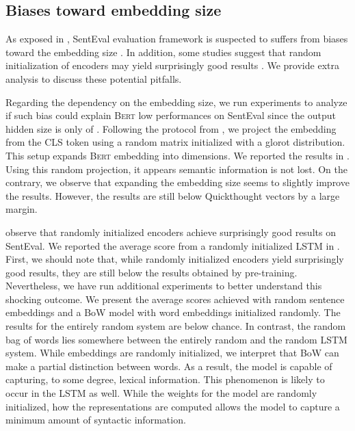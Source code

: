 
\subsection{Biases toward embedding size}

As exposed in , SentEval evaluation framework is suspected to suffers from biases toward the embedding size \parencite{eger_19}. In addition, some studies suggest that random initialization of encoders may yield surprisingly good results \parencite{wieting_19}. We provide extra analysis to discuss these potential pitfalls.

Regarding the dependency on the embedding size, we run experiments to analyze if such bias could explain \textsc{Bert} low performances on SentEval since the output hidden size is only of  . Following the protocol from \textcite{wieting_19}, we project the embedding from the \textsc{CLS} token using a random matrix initialized with a glorot distribution. This setup expands \textsc{Bert} embedding into  dimensions. We reported the results in . Using this random projection, it appears semantic information is not lost. 
On the contrary, we observe that expanding the embedding size seems to slightly improve the results.  However, the results are still below Quickthought vectors by a large margin.

\textcite{wieting_19} observe that randomly initialized encoders achieve surprisingly good results on SentEval. We reported the average score from a randomly initialized LSTM in . First, we should note that, while randomly initialized encoders yield surprisingly good results, they are still below the results obtained by pre-training. Nevertheless, we have run additional experiments to better understand this shocking outcome. We present the average scores achieved with random sentence embeddings and a BoW model with word embeddings initialized randomly. The results for the entirely random system are below chance.
In contrast, the random bag of words lies somewhere between the entirely random and the random LSTM system. While embeddings are randomly initialized, we interpret that BoW can make a partial distinction between words. As a result, the model is capable of capturing, to some degree, lexical information. This phenomenon is likely to occur in the LSTM as well. While the weights for the model are randomly initialized, how the representations are computed allows the model to capture a minimum amount of syntactic information.

